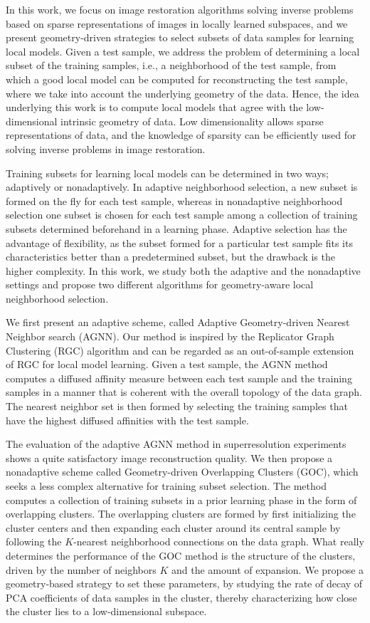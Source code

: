 \documentclass[journal]{IEEEtran}
\begin{document}
In this work, we focus on image restoration algorithms solving inverse problems based on sparse representations of images in locally learned subspaces, and we present geometry-driven strategies to select subsets of data samples for learning local models. Given a test sample, we address the problem of determining a local subset of the training samples, i.e., a neighborhood of the test sample, from which a good local model can be computed for reconstructing the test sample, where we take into account the underlying geometry of the data. Hence, the idea underlying this work is to compute local models that agree with the low-dimensional intrinsic geometry of data.  Low dimensionality allows sparse representations of data, and the knowledge of sparsity  can be efficiently used  for solving inverse problems in image restoration.

Training subsets for learning local models can be determined in two ways; adaptively or nonadaptively. In adaptive neighborhood selection, a new subset is formed on the fly for each test sample, whereas in nonadaptive neighborhood selection one subset is chosen for each test sample among a collection of training subsets determined beforehand in a learning phase. Adaptive selection has the advantage of flexibility, as the subset formed for a particular test sample fits its characteristics better than a predetermined subset, but the drawback is the higher complexity.
In this work, we study both the adaptive and the nonadaptive settings and propose two different algorithms for geometry-aware local neighborhood selection.

We first present an adaptive scheme, called Adaptive Geometry-driven Nearest Neighbor search (AGNN). Our method is inspired by the Replicator Graph Clustering (RGC) \cite{Donoser13replicator} algorithm and can be regarded as an out-of-sample extension of RGC for local model learning. Given a test sample, the AGNN method computes a diffused affinity measure between each test sample and the training samples in a manner that is coherent with the overall topology of the data graph. The nearest neighbor set is then formed by selecting the training samples that have the highest diffused affinities with the test sample.

The evaluation of the adaptive AGNN method in superresolution experiments 
shows a quite satisfactory image reconstruction quality. 
We then propose a nonadaptive scheme called Geometry-driven Overlapping Clusters (GOC), which seeks a less complex alternative for training subset selection. The method computes a collection of training subsets in a prior learning phase in the form of overlapping clusters. The overlapping clusters are formed by first initializing the cluster centers and then expanding each cluster around its central sample by following the $K$-nearest neighborhood connections on the data graph. What really determines the performance of the GOC method is the structure of the clusters, driven by the number of neighbors $K$ and the amount of expansion. We propose a geometry-based strategy to set these parameters, by studying the rate of decay of PCA coefficients of data samples in the cluster, thereby characterizing how close the cluster lies to a low-dimensional subspace.
\end{document}

